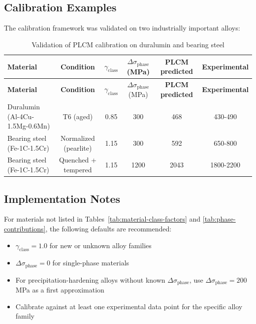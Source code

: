 \documentclass[12pt,a4paper]{article}
\begin{document}
	\subsection{Calibration Examples}
	
	The calibration framework was validated on two industrially important alloys:
	
	\begin{longtable}{lccccc}
		\caption{Validation of PLCM calibration on duralumin and bearing steel} \label{tab:calibration-validation} \\
		\toprule
		\textbf{Material} & \textbf{Condition} & \(\gamma_{\text{class}}\) & \(\Delta\sigma_{\text{phase}}\) (MPa) & \textbf{PLCM predicted} & \textbf{Experimental} \\
		\midrule
		\endfirsthead
		\toprule
		\textbf{Material} & \textbf{Condition} & \(\gamma_{\text{class}}\) & \(\Delta\sigma_{\text{phase}}\) (MPa) & \textbf{PLCM predicted} & \textbf{Experimental} \\
		\midrule
		\endhead
		Duralumin (Al-4Cu-1.5Mg-0.6Mn) & T6 (aged) & 0.85 & 300 & 468 & 430-490 \\
		Bearing steel (Fe-1C-1.5Cr) & Normalized (pearlite) & 1.15 & 300 & 592 & 650-800 \\
		Bearing steel (Fe-1C-1.5Cr) & Quenched + tempered & 1.15 & 1200 & 2043 & 1800-2200 \\
		\bottomrule
	\end{longtable}
	
	\subsection{Implementation Notes}
	
	For materials not listed in Tables~\ref{tab:material-class-factors} and \ref{tab:phase-contributions}, the following defaults are recommended:
	
	\begin{itemize}
		\item \(\gamma_{\text{class}} = 1.0\) for new or unknown alloy families
		\item \(\Delta\sigma_{\text{phase}} = 0\) for single-phase materials
		\item For precipitation-hardening alloys without known \(\Delta\sigma_{\text{phase}}\), use \(\Delta\sigma_{\text{phase}} = 200\) MPa as a first approximation
		\item Calibrate against at least one experimental data point for the specific alloy family
	\end{itemize}
	
\end{document}
